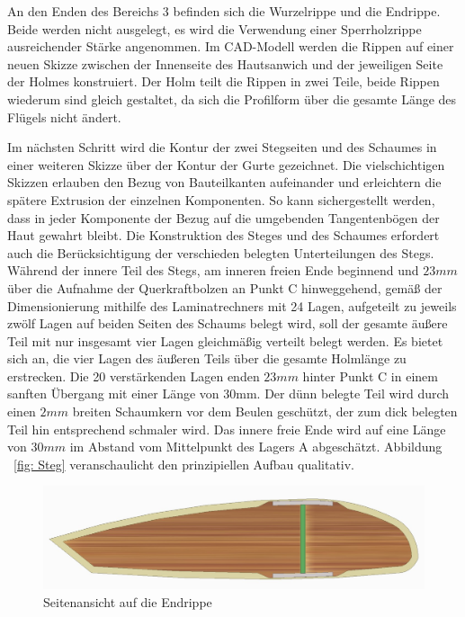\noindent An den Enden des Bereichs 3 befinden sich die Wurzelrippe und die Endrippe. Beide werden nicht ausgelegt, es wird die Verwendung einer Sperrholzrippe ausreichender Stärke angenommen. Im CAD-Modell werden die Rippen auf einer neuen Skizze zwischen der Innenseite des Hautsanwich und der jeweiligen Seite der Holmes konstruiert. Der Holm teilt die Rippen in zwei Teile, beide Rippen wiederum sind gleich gestaltet, da sich die Profilform über die gesamte Länge des Flügels nicht ändert.


\noindent Im nächsten Schritt wird die Kontur der zwei Stegseiten und des Schaumes in einer weiteren Skizze über der Kontur der Gurte gezeichnet. Die vielschichtigen Skizzen erlauben den Bezug von Bauteilkanten aufeinander und erleichtern die spätere Extrusion der einzelnen Komponenten. So kann sichergestellt werden, dass in jeder Komponente der Bezug auf die umgebenden Tangentenbögen der Haut gewahrt bleibt. Die Konstruktion des Steges und des Schaumes erfordert auch die Berücksichtigung der verschieden belegten Unterteilungen des Stegs. Während der innere Teil des Stegs, am inneren freien Ende beginnend und $ 23mm $ über die Aufnahme der Querkraftbolzen an Punkt C hinweggehend, gemäß der Dimensionierung mithilfe des Laminatrechners mit 24 Lagen, aufgeteilt zu jeweils zwölf Lagen auf beiden Seiten des Schaums belegt wird, soll der gesamte äußere Teil mit nur insgesamt vier Lagen gleichmäßig verteilt belegt werden. Es bietet sich an, die vier Lagen des äußeren Teils über die gesamte Holmlänge zu erstrecken. Die 20 verstärkenden Lagen enden $ 23mm $ hinter Punkt C in einem sanften Übergang mit einer Länge von 30mm. Der dünn belegte Teil wird durch einen $ 2mm $ breiten Schaumkern vor dem Beulen geschützt, der zum dick belegten Teil hin entsprechend schmaler wird. Das innere freie Ende wird auf eine Länge von $ 30mm $ im Abstand vom Mittelpunkt des Lagers A abgeschätzt. Abbildung ~\ref{fig: Steg} veranschaulicht den prinzipiellen Aufbau qualitativ.

\begin{figure}[h]
	\includegraphics[width=1.0\textwidth]{Bilder/Seite.jpg}
	\caption{Seitenansicht auf die Endrippe}
	\label{fig: Seite}
\end{figure}

